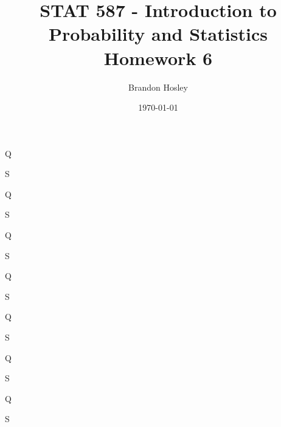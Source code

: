 \documentclass[answers]{exam}
\title{STAT 587 - Introduction to Probability and Statistics%
	\\ Homework 6}
\author{Brandon Hosley}
\date{\today}
\begin{document}
\maketitle
\begin{questions}

\question 
Q
\begin{solution}
	S
\end{solution}

\question 
Q
\begin{solution}
	S
\end{solution}

\question 
Q
\begin{solution}
	S
\end{solution}

\question 
Q
\begin{solution}
	S
\end{solution}

\question 
Q
\begin{solution}
	S
\end{solution}

\question 
Q
\begin{solution}
	S
\end{solution}

\question 
Q
\begin{solution}
	S
\end{solution}


\end{questions}
\end{document}
